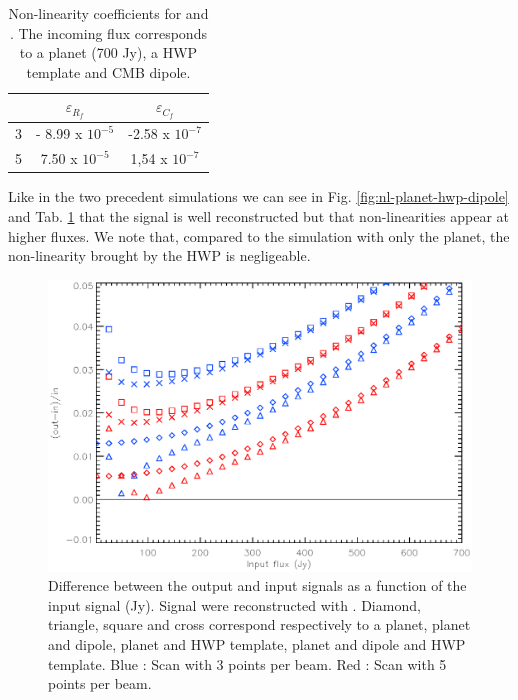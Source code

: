 \begin{table}[h!]
\center
	\begin{tabular}{|c|c|c|}
  	\hline
 	\backslashbox{$npts/fwhm$}{$\varepsilon$} & $	\varepsilon_{R_{f}}$ & $\varepsilon_{C_{f}} $ \\
	\hline
 	3  & - 8.99 x $10^{-5}$ & -2.58 x $10^{-7}$ \\
  	\hline
 	5 & 7.50 x $10^{-5}$ & 1,54 x $10^{-7}$ \\
  	\hline
	\end{tabular} 
\caption{Non-linearity coefficients \eps for \rf and \cf. The incoming flux corresponds to a planet (700 Jy), a HWP template and CMB dipole.}
\label{tab:eps-planet-hwp-dipole}
\end{table}

Like in the two precedent simulations we can see in Fig. \ref{fig:nl-planet-hwp-dipole} and Tab. \ref{tab:eps-planet-hwp-dipole} that the signal is well reconstructed but that non-linearities appear at higher fluxes. We note that, compared to the simulation with only the planet, the non-linearity brought by the HWP is negligeable.\\

\begin{figure}[h]
\center
	\includegraphics[scale=0.5]{Figures/diff-planet-hwp-dipole-rf.eps}
	\caption{Difference between the output and input signals as a function of the input signal (Jy). Signal were reconstructed with \rf. Diamond, triangle, square and cross correspond respectively to a planet, planet and dipole, planet and HWP template, planet and dipole and HWP template. Blue : Scan with 3 points per beam. Red : Scan with 5 points per beam.}
	\label{fig:diff-rf}
\end{figure}

